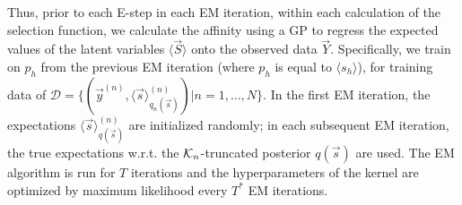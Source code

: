 Thus, prior to each E-step in each EM iteration, within each calculation of the selection function, we calculate the affinity  using a GP to regress the expected values of the latent variables $\langle \vec{S} \rangle$ onto the observed data $\vec{Y}$.  
Specifically, we train on $p_h$ from the previous EM iteration (where $p_h$ is equal to $\langle s_h \rangle$), for 
training data of 
$\mathcal{D} = \{ (\vec{y}^{(n)}, \langle\vec{s}\rangle^{(n)}_{q_n(\vec{s})}) | n = 1,\dots, N \}$.
%
In the first EM iteration, the expectations $\langle\vec{s}\rangle^{(n)}_{q(\vec{s})}$ are initialized randomly;
in each subsequent EM iteration, the true expectations w.r.t. the $\mathcal{K}_{n}$-truncated posterior $q(\vec{s})$ are used. 
The EM algorithm is run for $T$ iterations and the hyperparameters of the kernel are optimized by maximum likelihood every $T^*$ EM iterations.

